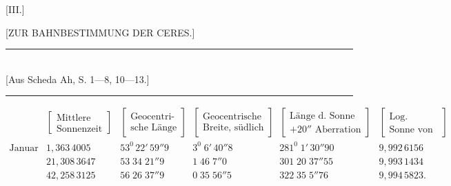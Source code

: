 \clearpage
\begingroup
\NoSourceHead
{}
\begin{center}
[III.]\par\medskip
{\large [ZUR BAHNBESTIMMUNG DER CERES.]}\par\medskip
\rule{.44\linewidth}{.3pt}\\
{\small [Aus Scheda Ah, S. 1—8, 10—13.]}\\
\rule{.44\linewidth}{.3pt}
\end{center}
\noindent{\small [S. 1]}\par
\begingroup\raggedright\noindent\hspace*{\parindent}\par\endgroup
\begin{center}
\end{center}
{\footnotesize\setlength{\arraycolsep}{2.5pt}
\[
\begin{array}{rlllll}
&\left[\begin{gathered}\text{Mittlere}\\\text{Sonnenzeit}\end{gathered}\right]
&\left[\begin{gathered}\text{Geocentri-}\\\text{sche Länge}\end{gathered}\right]
&\left[\begin{gathered}\text{Geocentrische}\\\text{Breite, südlich}\end{gathered}\right]
&\left[\begin{gathered}\text{Länge d. Sonne}\\+20''\text{ Aberration}\end{gathered}\right]
&\left[\begin{gathered}\text{Log. Abstand der}\\\text{Sonne von d. Erde}\end{gathered}\right]\\[3pt]
\text{Januar}&1{,}363\,4005&53^0\,22'\,59''9&3^0\;6'\,40''8&281^0\;1'\,30''90&9{,}992\,6156\\
&21{,}308\,3647&53\;34\;21''9&1\;46\;7''0&301\;20\;37''55&9{,}993\,1434\\
&42{,}258\,3125&56\;26\;37''9&0\;35\;56''5&322\;35\;5''76&9{,}994\,5823.
\end{array}
\]}
